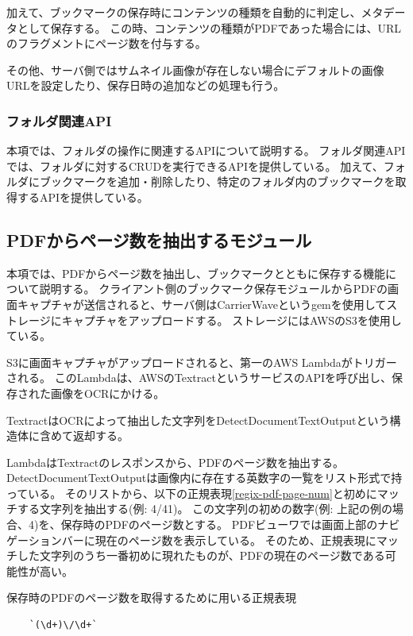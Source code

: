 加えて、ブックマークの保存時にコンテンツの種類を自動的に判定し、メタデータとして保存する。
この時、コンテンツの種類がPDFであった場合には、URLのフラグメントにページ数を付与する。

その他、サーバ側ではサムネイル画像が存在しない場合にデフォルトの画像URLを設定したり、保存日時の追加などの処理も行う。

\subsubsection{フォルダ関連API}
本項では、フォルダの操作に関連するAPIについて説明する。
フォルダ関連APIでは、フォルダに対するCRUDを実行できるAPIを提供している。
加えて、フォルダにブックマークを追加・削除したり、特定のフォルダ内のブックマークを取得するAPIを提供している。

\subsection{PDFからページ数を抽出するモジュール}
本項では、PDFからページ数を抽出し、ブックマークとともに保存する機能について説明する。
クライアント側のブックマーク保存モジュールからPDFの画面キャプチャが送信されると、サーバ側はCarrierWave\cite{carrier-wave}というgemを使用してストレージにキャプチャをアップロードする。
ストレージにはAWSのS3\cite{s3}を使用している。

S3に画面キャプチャがアップロードされると、第一のAWS Lambdaがトリガーされる。
このLambdaは、AWSのTextract\cite{textract}というサービスのAPIを呼び出し、保存された画像をOCRにかける。

TextractはOCRによって抽出した文字列をDetectDocumentTextOutput\cite{detect-document-text-output}という構造体に含めて返却する。

LambdaはTextractのレスポンスから、PDFのページ数を抽出する。
DetectDocumentTextOutputは画像内に存在する英数字の一覧をリスト形式で持っている。
そのリストから、以下の正規表現\ref{regix-pdf-page-num}と初めにマッチする文字列を抽出する(例: 4/41)。
この文字列の初めの数字(例: 上記の例の場合、4)を、保存時のPDFのページ数とする。
PDFビューワでは画面上部のナビゲーションバーに現在のページ数を表示している。
そのため、正規表現にマッチした文字列のうち一番初めに現れたものが、PDFの現在のページ数である可能性が高い。

\begin{itembox}[l]{保存時のPDFのページ数を取得するために用いる正規表現}
  \label{regix-pdf-page-num}
  \begin{verbatim}
    `(\d+)\/\d+`
  \end{verbatim}
\end{itembox}

